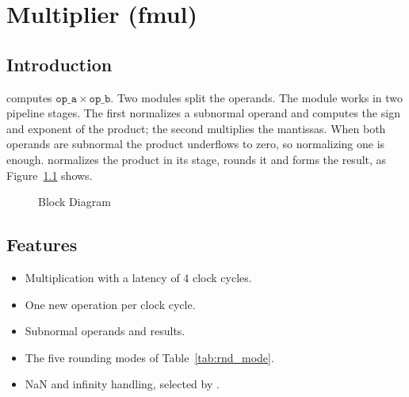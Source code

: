 \chapter{Multiplier (fmul)}
\label{ch:fmul}

\section{Introduction}

 computes $\mathtt{op\_a}\times\mathtt{op\_b}$. Two 
modules split the operands. The  module works in two pipeline stages. The
first normalizes a subnormal operand and computes the sign and exponent of the
product; the second multiplies the mantissas. When both operands are subnormal the
product underflows to zero, so normalizing one is enough.  normalizes the product in its
 stage, rounds it and forms the result, as Figure~\ref{fig:fmul} shows.

\begin{figure}[H]
\centering
{}
\caption{ Block Diagram}
\label{fig:fmul}
\end{figure}

\section{Features}

\begin{itemize}
\item Multiplication with a latency of 4 clock cycles.
\item One new operation per clock cycle.
\item Subnormal operands and results.
\item The five rounding modes of Table~\ref{tab:rnd_mode}.
\item NaN and infinity handling, selected by .
\end{itemize}


